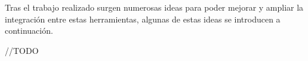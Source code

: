 Tras el trabajo realizado surgen numerosas ideas para poder mejorar y ampliar la integraci\'on entre estas herramientas, algunas de estas ideas se introducen a continuaci\'on.

//TODO